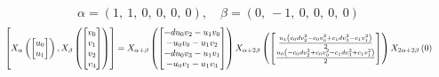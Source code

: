\documentclass[11pt]{article}
\theoremstyle{definition}
\begin{document}
\[
\alpha = \left( 1, \  1, \  0, \  0, \  0, \  0\right), \quad \beta = \left( 0, \  -1, \  0, \  0, \  0, \  0\right)
\]
\[
\scaletoalign{\textwidth}{\left[ X_{\alpha}\left(\left[\begin{matrix}u_{0}\\u_{1}\end{matrix}\right]\right), X_{\beta}\left(\left[\begin{matrix}v_{0}\\v_{1}\\v_{2}\\v_{3}\end{matrix}\right]\right) \right] = X_{\alpha + \beta}\left(\left[\begin{matrix}- d u_{0} v_{2} - u_{1} v_{0}\\- u_{0} v_{0} - u_{1} v_{2}\\- d u_{0} v_{3} - u_{1} v_{1}\\- u_{0} v_{1} - u_{1} v_{3}\end{matrix}\right]\right) X_{\alpha + 2\beta}\left(\left[\begin{matrix}\frac{u_{1} \left(c_{0} d v_{2}^{2} - c_{0} v_{0}^{2} + c_{1} d v_{3}^{2} - c_{1} v_{1}^{2}\right)}{2}\\\frac{u_{0} \left(- c_{0} d v_{2}^{2} + c_{0} v_{0}^{2} - c_{1} d v_{3}^{2} + c_{1} v_{1}^{2}\right)}{2}\end{matrix}\right]\right) X_{2\alpha + 2\beta}\left(0\right)}
\]
\end{document}
